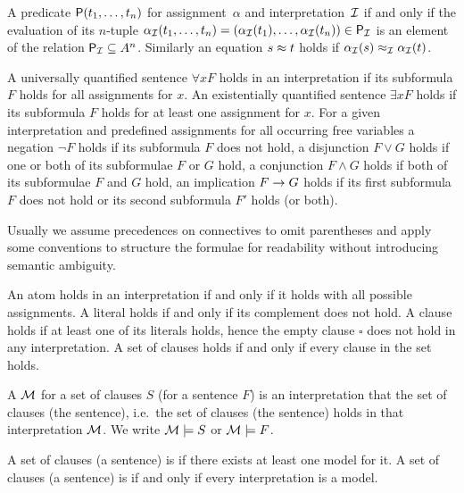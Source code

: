 \begin{definition}\label{def:semantics:atoms}
	A predicate \( \mathsf{P}(t_1,\ldots,t_n) \)
	 for assignment~\( \alpha \)
	and interpretation~\( \mathcal{I} \)
	if and only if the evaluation of its \(n\)-tuple \(
	\alpha_{\mathcal{I}}(t_1,\ldots,t_n) = (\alpha_{\mathcal{I}}({t_1}),\ldots,\alpha_{\mathcal{I}}({t_n})) \in \mathsf{P}_{\mathcal{I}} \)
	is an element of the relation \( \mathsf{P}_{\mathcal{I}}\subseteq A^n \).
	Similarly an equation \( s\approx t \)
	holds if \( \alpha_{\mathcal{I}}(s) \approx_{\mathcal{I}} \alpha_{\mathcal{I}}(t) \).
\end{definition}

\begin{definition}
	\label{def:semantics:FOF}
	A universally quantified sentence \( \forall x F \)
	holds in an interpretation if its subformula \( F \) holds for all assignments for \( x \).
	An existentially quantified sentence \( \exists xF \) holds if its subformula \( F \) holds for at least one assignment for \( x \).
	For a given interpretation and predefined assignments for all occurring free variables
	a negation \( \lnot F \) holds if its subformula \( F \) does not hold,
	a disjunction \( F\lor G \) holds if one or both of its subformulae \( F \) or \( G \) hold,
	a conjunction \( F\land G \) holds if both of its subformulae \( F \) and \( G \) hold,
	an implication \( F\rightarrow G \) holds if its first subformula \( F \) does not hold or its second subformula \( F' \) holds (or both).

	\begin{remark}Usually we assume precedences on connectives to omit parentheses
		and apply some conventions to structure the formulae for readability
		without introducing semantic ambiguity.
	\end{remark}
\end{definition}

\begin{definition}\label{def:semantics:CNF}
	An atom holds in an interpretation if and only if it
	holds with all possible assignments.
	A literal holds if and only if its complement does not hold.
	A clause holds if at least one of its literals holds,
	hence the empty clause \( \square \) does not hold in any interpretation.
	A set of clauses holds if and only if every clause in the set holds.
\end{definition}

\begin{definition}
	A  \( \mathcal{M} \) for a set of clauses \( S \) (for a sentence \( F \))
	is an interpretation that
	 the set of clauses (the sentence),
	i.e.~the set of clauses (the sentence) holds in that interpretation \( \mathcal{M} \).
	We write \( \mathcal{M}\models S \) or \( \mathcal{M}\models F \).

	A set of clauses (a sentence) is  if there exists at least one model for it.
	A set of clauses (a sentence) is  if and only if every interpretation is a model.
\end{definition}

